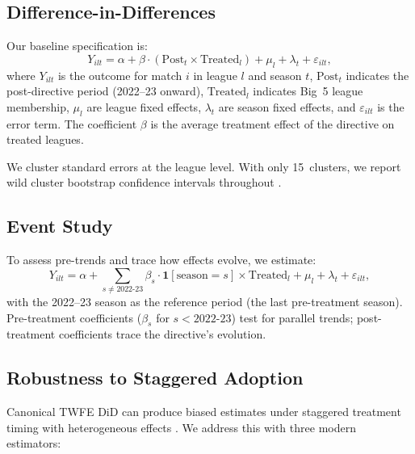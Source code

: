 \documentclass[12pt]{article}
\begin{document}
\subsection{Difference-in-Differences}

Our baseline specification is:
\begin{equation}\label{eq:did}
  Y_{ilt} = \alpha + \beta \cdot (\text{Post}_t \times \text{Treated}_l)
  + \mu_l + \lambda_t + \varepsilon_{ilt},
\end{equation}
where $Y_{ilt}$ is the outcome for match $i$ in league $l$ and
season $t$, $\text{Post}_t$ indicates the post-directive period
(2022--23 onward), $\text{Treated}_l$ indicates Big~5 league membership,
$\mu_l$ are league fixed effects, $\lambda_t$ are season fixed effects,
and $\varepsilon_{ilt}$ is the error term. The coefficient $\beta$ is
the average treatment effect of the directive on treated leagues.

We cluster standard errors at the league level. With only 15~clusters,
we report wild cluster bootstrap confidence intervals throughout
\citep{cameron2008bootstrap, webb2023reworking}.

\subsection{Event Study}

To assess pre-trends and trace how effects evolve, we
estimate:
\begin{equation}\label{eq:eventstudy}
  Y_{ilt} = \alpha + \sum_{s \neq 2022\text{-}23} \beta_s
  \cdot \mathbf{1}[\text{season} = s] \times \text{Treated}_l
  + \mu_l + \lambda_t + \varepsilon_{ilt},
\end{equation}
with the 2022--23 season as the reference period (the last
pre-treatment season). Pre-treatment
coefficients ($\beta_s$ for $s < 2022\text{-}23$) test for parallel
trends; post-treatment coefficients trace the directive's evolution.

\subsection{Robustness to Staggered Adoption}

Canonical TWFE DiD can produce biased estimates under staggered treatment
timing with heterogeneous effects
\citep{goodmanbacon2021difference, baker2022much}. We address this with
three modern estimators:
\end{document}
